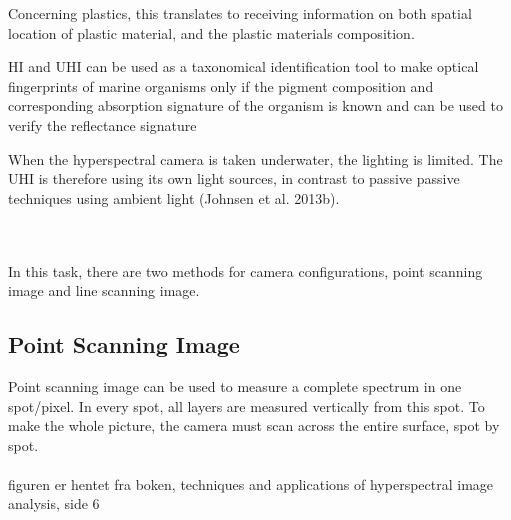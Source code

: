 Concerning plastics, this translates to receiving information on both spatial location of plastic material, and the plastic materials composition. 

HI and UHI can be used as a taxonomical identification tool to make optical fingerprints of marine organisms only if the pigment composition and corresponding absorption signature of the organism is known and can be used to verify the reflectance signature

When the hyperspectral camera is taken underwater, the lighting is limited. The UHI is therefore using its own light sources, in contrast to passive passive techniques using ambient light (Johnsen et al. 2013b).


\\\\In this task, there are two methods for camera configurations, point scanning image and line scanning image.
\subsection{Point Scanning Image}
Point scanning image can be used to measure a complete spectrum in one spot/pixel. In every spot, all layers are measured vertically from this spot. To make the whole picture, the camera must scan across the entire surface, spot by spot.
\\\\
figuren er hentet fra boken, techniques and applications of hyperspectral image analysis, side 6

